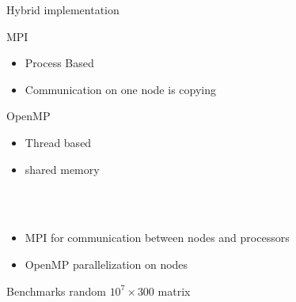 \begin{frame}{Hybrid implementation}
	\Large{}
	\normalsize 

	\begin{minipage}{\textwidth}
		\centering
		\vspace{5mm}
		\begin{minipage}[t]{0.49\textwidth}
			MPI
			\begin{itemize}
				\item Process Based
				\item Communication on one node is copying
			\end{itemize}
		\end{minipage}
		\begin{minipage}[t]{0.49\textwidth}
			OpenMP
			\begin{itemize}
				\item Thread based
				\item shared memory
			\end{itemize}
		\end{minipage}
	\end{minipage}\\
	\Large{\vspace{5mm}}\\
	\normalsize
	\vspace{5mm}
	\begin{itemize}
		\item MPI for communication between nodes and processors
		\item OpenMP parallelization on nodes
	\end{itemize}
\end{frame}

\begin{frame}{Benchmarks}
	\Large{}
	\normalsize random $10^7 \times 300 $ matrix
	
	\centering
	\scalebox{0.75}{
		
	}	
\end{frame}